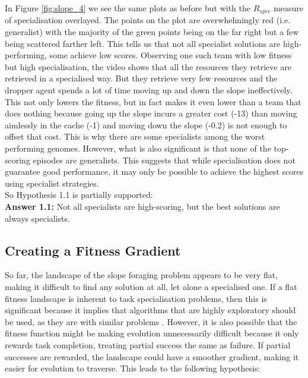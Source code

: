 \documentclass[12pt]{article}
\begin{document}
In Figure \ref{fig:slope_4} we see the same plots as before but with the $R_{spec}$ measure of specialisation overlayed.
The points on the plot are overwhelmingly red (i.e. generalist) with the majority of the green points being on the far right but a few being scattered farther left.
This tells us that not all specialist solutions are high-performing, some achieve low scores.
Observing one such team with low fitness but high specialisation, the video shows that all the resources they retrieve are retrieved in a specialised way.
But they retrieve very few resources and the dropper agent spends a lot of time moving up and down the slope ineffectively.
This not only lowers the fitness, but in fact makes it even lower than a team that does nothing because going up the slope incurs a greater cost (-13) than moving aimlessly in the cache (-1) and moving down the slope (-0.2) is not enough to offset that cost.
This is why there are some specialists among the worst performing genomes.
However, what is also significant is that none of the top-scoring episodes are generalists.
This suggests that while specialisation does not guarantee good performance, it may only be possible to achieve the highest scores using specialist strategies.\\

So Hypothesis 1.1 is partially supported:\\

\textbf{Answer 1.1:} Not all specialists are high-scoring, but the best solutions are always specialists.\\

\subsection{Creating a Fitness Gradient}

So far, the landscape of the slope foraging problem appears to be very flat, making it difficult to find any solution at all, let alone a specialised one.
If a flat fitness landscape is inherent to task specialisation problems, then this is significant because it implies that algorithms that are highly exploratory should be used, as they are with similar problems \cite{oller:AAMAS:2020}.
However, it is also possible that the fitness function might be making evolution unnecessarily difficult because it only rewards task completion, treating partial success the same as failure.
If partial successes are rewarded, the landscape could have a smoother gradient, making it easier for evolution to traverse.
This leads to the following hypothesis:\\
\end{document}

